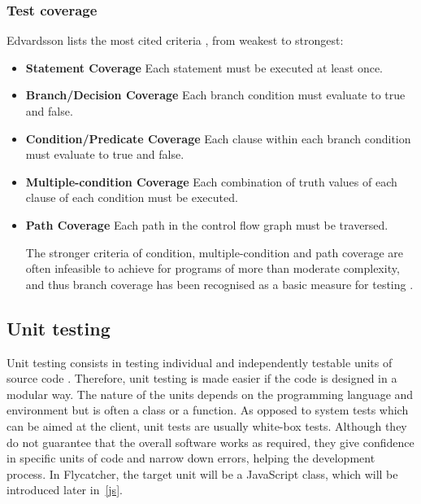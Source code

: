 \documentclass[a4paper,11pt,titlepage]{report}
\begin{document}
\subsubsection{Test coverage}
Edvardsson lists the most cited criteria \cite{edvardsson1999survey}, from weakest to strongest:
\begin{itemize}
	\item \textbf{Statement Coverage} Each statement must be executed at least once.
 	\item \textbf{Branch/Decision Coverage} Each branch condition must evaluate to true and false.
 	\item \textbf{Condition/Predicate Coverage} Each clause within each branch condition must evaluate to true and false.
 	\item \textbf{Multiple-condition Coverage} Each combination of truth values of each clause of each condition must be executed.
 	\item \textbf{Path Coverage} Each path in the control flow graph must be traversed.


The stronger criteria of condition, multiple-condition and path coverage are often infeasible to achieve for programs of more than moderate complexity, and thus branch coverage has been recognised as a basic measure for testing \cite{edvardsson1999survey}.
\end{itemize}

\subsection{Unit testing}

Unit testing consists in testing individual and independently testable units of source code \cite{myers2011art}. Therefore, unit testing is made easier if the code is designed in a modular way. The nature of the units depends on the programming language and environment but is often a class or a function. As opposed to system tests which can be aimed at the client, unit tests are usually white-box tests. Although they do not guarantee that the overall software works as required, they give confidence in specific units of code and narrow down errors, helping the development process. In \textsf{Flycatcher}, the target unit will be a JavaScript class, which will be introduced later in~\ref{js}.
\end{document}
